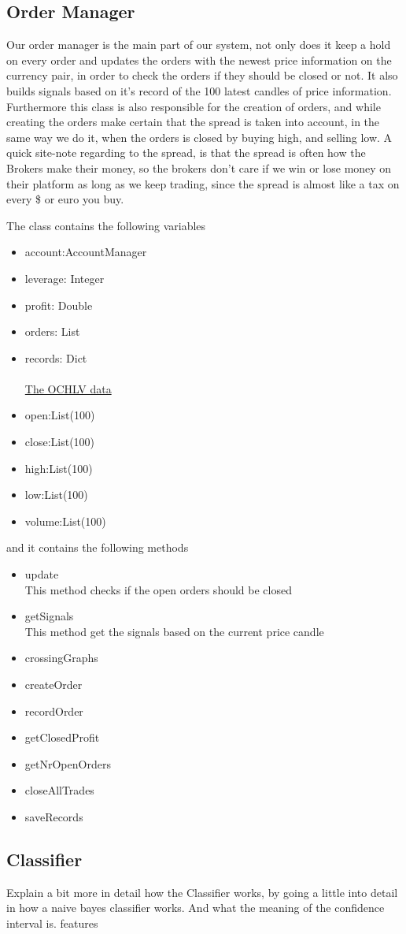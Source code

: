\subsection{Order Manager}
Our order manager is the main part of our system, not only does it keep a hold on every order and updates the orders with the newest price information on the currency pair, in order to check the orders if they should be closed or not. It also builds signals based on it's record of the 100 latest candles of price information. Furthermore this class is also responsible for the creation of orders, and while creating the orders make certain that the spread is taken into account, in the same way we do it, when the orders is closed by buying high, and selling low. A quick site-note regarding to the spread, is that the spread is often how the Brokers make their money, so the brokers don't care if we win or lose money on their platform as long as we keep trading, since the spread is almost like a tax on every \$ or euro you buy.

The class contains the following variables
\begin{itemize}
\item{account:AccountManager}
\item{leverage: Integer}
\item{profit: Double}
\item{orders: List}
\item{records: Dict}
\\
\\
\underline{The OCHLV data}
\item{open:List(100)}
\item{close:List(100)}
\item{high:List(100)}
\item{low:List(100)}
\item{volume:List(100)}
\end{itemize}

and it contains the following methods
\begin{itemize}
\item{update}
\\
This method checks if the open orders should be closed
\item{getSignals}\\
This method get the signals based on the current price candle
\item{crossingGraphs}
\item{createOrder}
\item{recordOrder}
\item{getClosedProfit}
\item{getNrOpenOrders}
\item{closeAllTrades}
\item{saveRecords}
\end{itemize}


\subsection{Classifier}
Explain a bit more in detail how the Classifier works, by going a little into detail in how a naive bayes classifier works. And what the meaning of the confidence interval is.
features